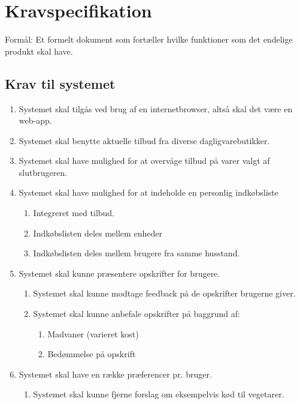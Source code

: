\chapter{Kravspecifikation}
Formål: Et formelt dokument som fortæller hvilke funktioner som det endelige produkt skal have. 

\section{Krav til systemet}
\begin{enumerate}
	\item Systemet skal tilgås ved brug af en internetbrowser, altså skal det være en web-app.
	\item Systemet skal benytte aktuelle tilbud fra diverse dagligvarebutikker.
	\item Systemet skal have mulighed for at overvåge tilbud på varer valgt af slutbrugeren.
	\item Systemet skal have mulighed for at indeholde en personlig indkøbsliste
	\begin{enumerate}
		\item Integreret med tilbud.
		\item Indkøbslisten deles mellem enheder
		\item Indkøbslisten deles mellem brugere fra samme husstand. 
	\end{enumerate}
	\item Systemet skal kunne præsentere opskrifter for brugere.
	\begin{enumerate}
		\item Systemet skal kunne modtage feedback på de opskrifter brugerne giver.
		\item Systemet skal kunne anbefale opskrifter på baggrund af:
		\begin{enumerate}
			\item Madvaner (varieret kost)
			\item Bedømmelse på opskrift
		\end{enumerate}
	\end{enumerate}
	\item Systemet skal have en række præferencer pr. bruger.
	\begin{enumerate}
		\item Systemet skal kunne fjerne forslag om eksempelvis kød til vegetarer.
	\end{enumerate}
\end{enumerate}

